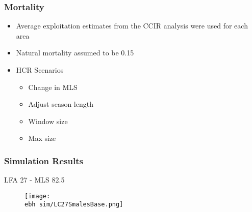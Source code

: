 \documentclass{beamer}
\newcommand{\ebh}{\string~/bio.data/bio.lobster/figures/LFA2733Framework2018/} %
\begin{document}
\begin{frame}
\frametitle{Mortality}
\begin{itemize}
\item Average exploitation estimates from the CCIR analysis were used for each area
\item Natural mortality assumed to be 0.15



\item HCR Scenarios
\begin{itemize}
\item Change in MLS
\item Adjust season length
\item Window size
\item Max size
\end{itemize}

\end{itemize}
\end{frame}



\begin{frame}
\frametitle{Simulation Results}
LFA 27 - MLS 82.5
\begin{figure}
        \begin{center}
            \texttt{[image: \\ebh sim/LC27SmalesBase.png]}
        \end{center}
    \end{figure}
\end{frame}
\end{document}
